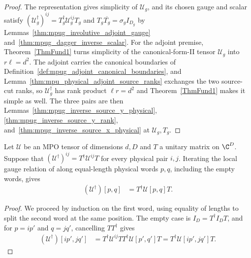\begin{proof}\leanok
    The representation gives simplicity of $\mathcal U_g$, and its
    chosen gauge and scalar satisfy
    $(\mathcal U_g^\dagger)^{ij}=T_g^\dagger\mathcal U_g^{ij}T_g$ and
    $T_g\overline{T_g}=\sigma_gI_{D_g}$ by
    Lemmas~\ref{thm:mpug_involutive_adjoint_gauge}
    and~\ref{thm:mpug_dagger_inverse_scalar}. For the adjoint premise,
    Theorem~\ref{ThmFund1} turns simplicity of the canonical-form-II
    tensor $\mathcal U_g$ into $r\ell=d^2$. The adjoint carries the
    canonical boundaries of Definition~\ref{def:mpug_adjoint_canonical_boundaries},
    and Lemma~\ref{thm:mpu_physical_adjoint_source_ranks} exchanges the
    two source-cut ranks, so $\mathcal U_g^\dagger$ has rank product
    $\ell r=d^2$ and Theorem~\ref{ThmFund1} makes it simple as well. The
    three pairs are then
    Lemmas~\ref{thm:mpug_inverse_source_y_physical},
    \ref{thm:mpug_inverse_source_y_rank},
    and~\ref{thm:mpug_inverse_source_x_physical} at $\mathcal U_g,T_g$.
\end{proof}

\begin{lemma}
    \label{thm:mpug_inverse_word_gauge}
    \leanok
    Let $\mathcal U$ be an MPO tensor of dimensions $d,D$ and $T$ a
    unitary matrix on $\C^D$. Suppose that
    $(\mathcal U^\dagger)^{ij}=T^\dagger\mathcal U^{ij}T$ for every
    physical pair $i,j$. Iterating the local gauge relation of
    \cite[lines~1552--1557]{FrancoRubio2025MPUGauging} along equal-length
    physical words $p,q$, including the empty words, gives
    \begin{align}
        (\mathcal U^\dagger)[p,q] & =T^\dagger\mathcal U[p,q]T.
    \end{align}
\end{lemma}
\begin{proof}\leanok
    We proceed by induction on the first word, using equality of lengths to
    split the second word at the same position. The empty case is
    $I_D=T^\dagger I_DT$, and for $p=ip'$ and $q=jq'$, cancelling $TT^\dagger$
    gives
    \begin{align}
        (\mathcal U^\dagger)[ip',jq']
         & =T^\dagger\mathcal U^{ij}T
        T^\dagger\mathcal U[p',q']T
        =T^\dagger\mathcal U[ip',jq']T.
    \end{align}
\end{proof}

